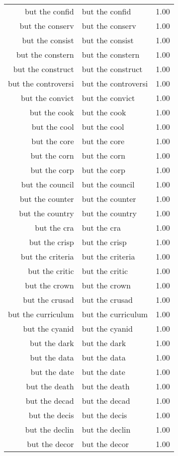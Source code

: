 \begin{table}[ht]
\begin{tabular}{rlr}
  but the confid & but the confid & 1.00 \\ 
  but the conserv & but the conserv & 1.00 \\ 
  but the consist & but the consist & 1.00 \\ 
  but the constern & but the constern & 1.00 \\ 
  but the construct & but the construct & 1.00 \\ 
  but the controversi & but the controversi & 1.00 \\ 
  but the convict & but the convict & 1.00 \\ 
  but the cook & but the cook & 1.00 \\ 
  but the cool & but the cool & 1.00 \\ 
  but the core & but the core & 1.00 \\ 
  but the corn & but the corn & 1.00 \\ 
  but the corp & but the corp & 1.00 \\ 
  but the council & but the council & 1.00 \\ 
  but the counter & but the counter & 1.00 \\ 
  but the country & but the country & 1.00 \\ 
  but the cra & but the cra & 1.00 \\ 
  but the crisp & but the crisp & 1.00 \\ 
  but the criteria & but the criteria & 1.00 \\ 
  but the critic & but the critic & 1.00 \\ 
  but the crown & but the crown & 1.00 \\ 
  but the crusad & but the crusad & 1.00 \\ 
  but the curriculum & but the curriculum & 1.00 \\ 
  but the cyanid & but the cyanid & 1.00 \\ 
  but the dark & but the dark & 1.00 \\ 
  but the data & but the data & 1.00 \\ 
  but the date & but the date & 1.00 \\ 
  but the death & but the death & 1.00 \\ 
  but the decad & but the decad & 1.00 \\ 
  but the decis & but the decis & 1.00 \\ 
  but the declin & but the declin & 1.00 \\ 
  but the decor & but the decor & 1.00 \\ 

\end{tabular}
\end{table}
